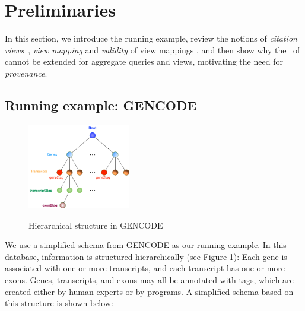 \section{Preliminaries}\label{Sec: examples}
In this section, we introduce the running example, %
review the notions of \textit{citation views}~\cite{davidson2017model}, {\em view mapping} and {\em validity} of view mappings \cite{wu2018data}, and then show why the \rba\ of \cite{wu2018data} cannot be extended for aggregate queries and views, motivating the need for {\em provenance}.

\subsection{Running example: GENCODE}\label{subsec:running example}

\begin{figure}[t!]
    \centering
    \includegraphics[width=0.4\textwidth,height=0.24\textwidth]{Figures/Gens_Trans_Tree.jpg}
    \caption{Hierarchical structure in GENCODE}
    \small \label{fig:gencode}
\end{figure}


We use a simplified schema from GENCODE as our running example. In this database, information is structured hierarchically (see Figure \ref{fig:gencode}): Each gene is associated with one or more transcripts, and each transcript has one or more exons. Genes, transcripts, and exons may all be annotated with tags, which are created either by human experts or by programs. A simplified schema based on this structure is shown below:

